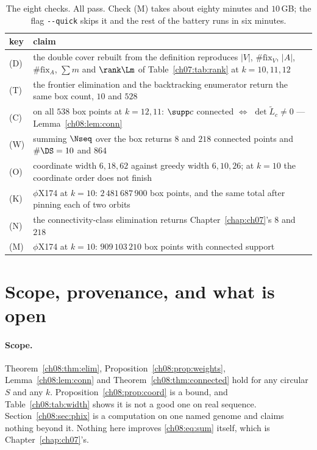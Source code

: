 \begin{table}[t]
\centering
\small
\begin{tabular}{@{}l@{\ \ }p{}@{}}
\toprule
key & claim\\
\midrule
(D) & the double cover rebuilt from the definition reproduces $|V|$, $\#\mathrm{fix}_V$,
$|A|$, $\#\mathrm{fix}_A$, $\sum m$ and $\rank\Lm$ of Table~\ref{ch07:tab:rank} at $k=10,11,12$\\
(T) & the frontier elimination and the backtracking enumerator return the same box count,
$10$ and $528$\\
(C) & on all $538$ box points at $k=12,11$: $\supp c$ connected $\iff$
$\det\widetilde L_c\ne0$ --- Lemma~\ref{ch08:lem:conn}\\
(W) & summing $\Nseq$ over the box returns $8$ and $218$ connected points and
$\#\DS=10$ and $864$\\
(O) & coordinate width $6,18,62$ against greedy width $6,10,26$; at $k=10$ the coordinate
order does not finish\\
(K) & $\phi$X174 at $k=10$: $2\,481\,687\,900$ box points, and the same total after pinning
each of two orbits\\
(N) & the connectivity-class elimination returns Chapter~\ref{chap:ch07}'s $8$ and $218$\\
(M) & $\phi$X174 at $k=10$: $909\,103\,210$ box points with connected support\\
\bottomrule
\end{tabular}
\caption{The eight checks. All pass. Check (M) takes about eighty minutes and $10$\,GB; the
flag \texttt{-{}-quick} skips it and the rest of the battery runs in six minutes.}
\label{ch08:tab:checks}
\end{table}

\section{Scope, provenance, and what is open}\label{ch08:sec:scope}

\paragraph{Scope.} Theorem~\ref{ch08:thm:elim}, Proposition~\ref{ch08:prop:weights},
Lemma~\ref{ch08:lem:conn} and Theorem~\ref{ch08:thm:connected} hold for any circular $S$ and any $k$.
Proposition~\ref{ch08:prop:coord} is a bound, and Table~\ref{ch08:tab:width} shows it is not a good one
on real sequence. Section~\ref{ch08:sec:phix} is a computation on one named genome and claims
nothing beyond it. Nothing here improves \eqref{ch08:eq:sum} itself, which is Chapter~\ref{chap:ch07}'s.

